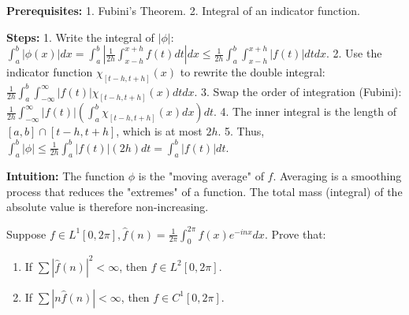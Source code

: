 \begin{solution}
\textbf{Prerequisites:}
1. Fubini's Theorem.
2. Integral of an indicator function.

\textbf{Steps:}
1. Write the integral of $|\phi|$: $\int_a^b |\phi(x)| dx = \int_a^b \left| \frac{1}{2h} \int_{x-h}^{x+h} f(t) dt \right| dx \leq \frac{1}{2h} \int_a^b \int_{x-h}^{x+h} |f(t)| dt dx$.
2. Use the indicator function $\chi_{[t-h, t+h]}(x)$ to rewrite the double integral:
$\frac{1}{2h} \int_a^b \int_{-\infty}^{\infty} |f(t)| \chi_{[t-h, t+h]}(x) dt dx$.
3. Swap the order of integration (Fubini):
$\frac{1}{2h} \int_{-\infty}^{\infty} |f(t)| \left( \int_a^b \chi_{[t-h, t+h]}(x) dx \right) dt$.
4. The inner integral is the length of $[a, b] \cap [t-h, t+h]$, which is at most $2h$.
5. Thus, $\int_a^b |\phi| \leq \frac{1}{2h} \int_a^b |f(t)| (2h) dt = \int_a^b |f(t)| dt$.

\textbf{Intuition:}
The function $\phi$ is the "moving average" of $f$. Averaging is a smoothing process that reduces the "extremes" of a function. The total mass (integral) of the absolute value is therefore non-increasing.
\end{solution}

\begin{exercise}
\label{analysis:2010:11}
Suppose $f \in L^1[0, 2\pi], \hat{f}(n) = \frac{1}{2\pi} \int_0^{2\pi} f(x) e^{-inx} dx$. Prove that:
\begin{enumerate}
    \item If $\sum |\hat{f}(n)|^2 < \infty$, then $f \in L^2[0, 2\pi]$.
    \item If $\sum |n \hat{f}(n)| < \infty$, then $f \in C^1[0, 2\pi]$.
\end{enumerate}
\end{exercise}

